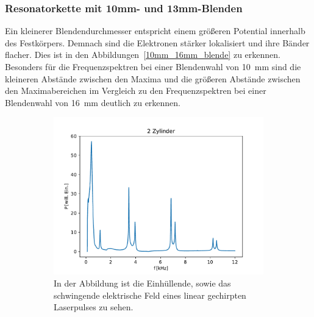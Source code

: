         \subsubsection*{Resonatorkette mit 10mm- und 13mm-Blenden}
            Ein kleinerer Blendendurchmesser entspricht einem größeren Potential innerhalb des Festkörpers. Demnach sind die Elektronen stärker lokalisiert und ihre Bänder flacher. Dies ist in den 
            Abbildungen~\ref{10mm_16mm_blende} zu erkennen. Besonders für die Frequenzspektren bei einer Blendenwahl von \SI{10}{\milli\metre} sind die kleineren Abstände zwischen den Maxima und die größeren
            Abstände zwischen den Maximabereichen im Vergleich zu den Frequenzspektren bei einer Blendenwahl von \SI{16}{\milli\metre} deutlich zu erkennen.
            \FloatBarrier
            \begin{figure}[ht]
                \centering
                \begin{subfigure}[b]{0.45\textwidth}
                    \centering
                    \includegraphics[scale=0.45]{./pictures/1dim_2_Zylinder_10mm.pdf}
                    \caption{In der Abbildung ist die Einhüllende, sowie das schwingende elektrische Feld eines linear gechirpten Laserpulses zu sehen.}
                    \label{fig:1dim_2_Zylinder_10mm}
                \end{subfigure}
                \centering
                \begin{subfigure}[b]{0.45\textwidth}
                    \centering

\end{subfigure}
\end{figure}
